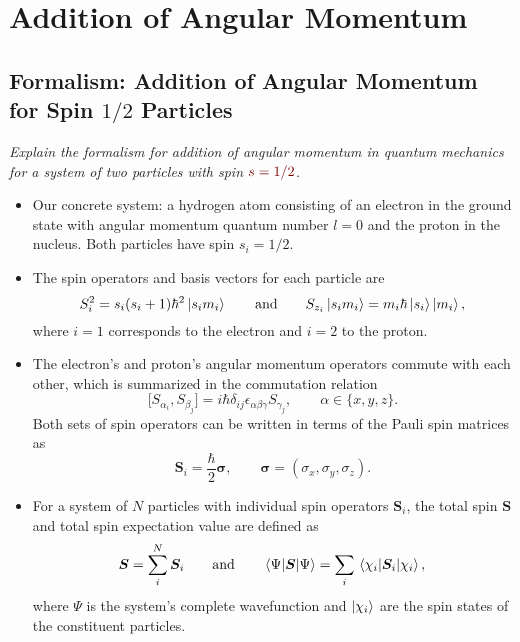 \documentclass[11pt, a4paper]{article}
\newcommand{\qmath}[1]{\textcolor{Maroon}{#1}}  %
\newcommand{\eqtext}[1]{\qquad \text{#1} \qquad}
\renewcommand{\vec}[1]{\bm{#1}}  %
\renewcommand{\S}{\vec{S}}  %
\renewcommand{\P}{\Psi}  %
\begin{document}
\newpage
\section{Addition of Angular Momentum}

\subsection{Formalism: Addition of Angular Momentum for Spin $ 1/2 $ Particles}
\textit{Explain the formalism for addition of angular momentum in quantum mechanics for a system of two particles with spin $ \qmath{s = 1/2} $.}
\begin{itemize}
	\item Our concrete system: a hydrogen atom consisting of an electron in the ground state with angular momentum quantum number $ l = 0 $ and the proton in the nucleus. Both particles have spin $ s_{i} = 1/2 $.

    \item The spin operators and basis vectors for each particle are
	\begin{equation*}
		S_{i}^{2} = s_{i}(s_{i} + 1)\hbar^{2}\ket{s_{i}m_{i}} \eqtext{and} S_{z_{i}}\ket{s_{i}m_{i}} = m_{i}\hbar \ket{s_{i}}\ket{m_{i}},
	\end{equation*}
	where $ i = 1 $ corresponds to the electron and $ i = 2 $ to the proton. 
	
	\item The electron's and proton's angular momentum operators commute with each other, which is summarized in the commutation relation
	\begin{equation*}
		\big[S_{\alpha_{i}}, S_{\beta_{j}}\big] = i \hbar \delta_{ij}\epsilon_{\alpha \beta \gamma}S_{\gamma_{j}}, \qquad \alpha \in \{x, y, z\}.
	\end{equation*}
	Both sets of spin operators can be written in terms of the Pauli spin matrices as
	\begin{equation*}
        \vec{S}_{i} = \frac{\hbar}{2}\vec{\sigma}, \qquad \vec{\sigma} = \left(\sigma_{x}, \sigma_{y}, \sigma_{z}\right).
	\end{equation*}
	
	\item For a system of $ N $ particles with individual spin operators $ \S_{i} $, the total spin $ \S $ and total spin expectation value are defined as
	\begin{equation*}
		\S = \sum_{i}^{N}\S_{i} \qquad \text{and} \qquad \mel{\P}{\S}{\P} = \sum_{i}\mel{\chi_{i}}{\S_{i}}{\chi_{i}},
	\end{equation*}
	where $ \P $ is the system's complete wavefunction and $ \ket{\chi_{i}} $ are the spin states of the constituent particles. 
	

\end{itemize}
\end{document}
